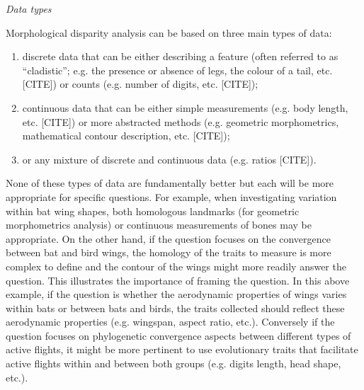 \documentclass[12pt,letterpaper]{article}
\renewcommand{\subsection}[1]{%
\bigskip
\begin{center}
\begin{large}
\normalfont\itshape #1
\end{large}
\end{center}}
\begin{document}
\subsection{Data types}
Morphological disparity analysis can be based on three main types of data:
\begin{enumerate}
    \item discrete data that can be either describing a feature (often referred to as ``cladistic''; e.g. the presence or absence of legs, the colour of a tail, etc. [CITE]) or counts (e.g. number of digits, etc. [CITE]);
    \item continuous data that can be either simple measurements (e.g. body length, etc. [CITE]) or more abstracted methods (e.g. geometric morphometrics, mathematical contour description, etc. [CITE]);
    \item or any mixture of discrete and continuous data (e.g. ratios [CITE]).
\end{enumerate}
None of these types of data are fundamentally better but each will be more appropriate for specific questions.
For example, when investigating variation within bat wing shapes, both homologous landmarks (for geometric morphometrics analysis) or continuous measurements of bones may be appropriate.
On the other hand, if the question focuses on the convergence between bat and bird wings, the homology of the traits to measure is more complex to define and the contour of the wings might more readily answer the question. %
This illustrates the importance of framing the question.
In this above example, if the question is whether the aerodynamic properties of wings varies within bats or between bats and birds, the traits collected should reflect these aerodynamic properties (e.g. wingspan, aspect ratio, etc.).
Conversely if the question focuses on phylogenetic convergence aspects between different types of active flights, it might be more pertinent to use evolutionary traits that facilitate active flights within and between both groups (e.g. digits length, head shape, etc.).
\end{document}
